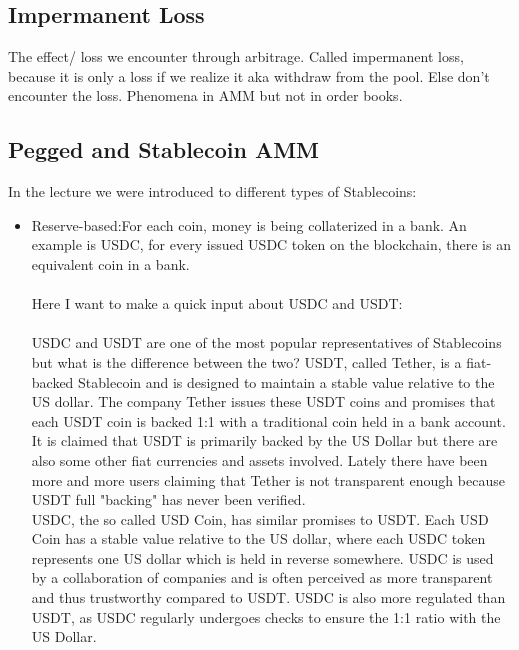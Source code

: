\documentclass{article}
\begin{document}
\subsection{Impermanent Loss} %
The effect/ loss we encounter through arbitrage. Called impermanent loss, because it is only a loss if we realize it aka withdraw from the pool. Else don't encounter the loss. Phenomena in AMM but not in order books.


\subsection{Pegged and Stablecoin AMM} 
In the lecture we were introduced to different types of Stablecoins: 
\begin{itemize}
    \item {Reserve-based}:For each coin, money is being collaterized in a bank. An example is USDC, for every issued USDC token on the blockchain, there is an equivalent coin in a bank. \\\\
    Here I want to make a quick input about USDC and USDT:\\ \\USDC and USDT are one of the most popular representatives of Stablecoins but what is the difference between the two? USDT, called Tether, is a fiat-backed Stablecoin and is designed to maintain a stable value relative to the US dollar. The company Tether issues these USDT coins and promises that each USDT coin is backed 1:1 with a traditional coin held in a bank account. It is claimed that USDT is primarily backed by the US Dollar but there are also some other fiat currencies and assets involved. Lately there have been more and more users claiming that Tether is not transparent enough because USDT full "backing" has never been verified.\\ USDC, the so called USD Coin, has similar promises to USDT. Each USD Coin has a stable value relative to the US dollar, where each USDC token represents one US dollar which is held in reverse somewhere. USDC is used by a collaboration of companies and is often perceived as more transparent and thus trustworthy compared to USDT. USDC is also more regulated than USDT, as USDC regularly undergoes checks to ensure the 1:1 ratio with the US Dollar.


\end{itemize}
\end{document}
